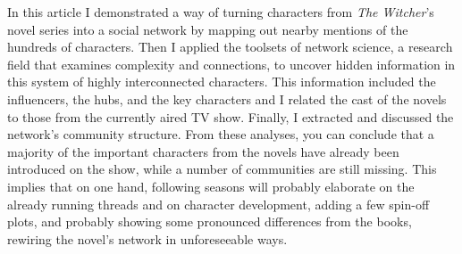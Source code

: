 \documentclass[fleqn,12pt]{wlscirep}
\begin{document}
In this article I demonstrated a way of turning characters from {\it The Witcher}’s novel series into a social network by mapping out nearby mentions of the hundreds of characters. Then I applied the toolsets of network science, a research field that examines complexity and connections, to uncover hidden information in this system of highly interconnected characters. This information included the influencers, the hubs, and the key characters and I related the cast of the novels to those from the currently aired TV show. Finally, I extracted and discussed the network’s community structure. From these analyses, you can conclude that a majority of the important characters from the novels have already been introduced on the show, while a number of communities are still missing. This implies that on one hand, following seasons will probably elaborate on the already running threads and on character development, adding a few spin-off plots, and probably showing some pronounced differences from the books, rewiring the novel’s network in unforeseeable ways.





\end{document}
